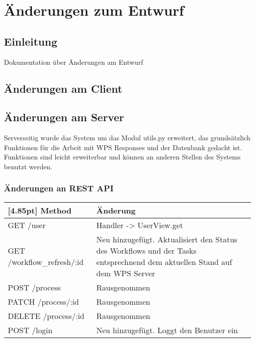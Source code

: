 \chapter{Änderungen zum Entwurf}
    
    \section{Einleitung}
        Dokumentation über Änderungen am Entwurf
    
    \section{Änderungen am Client}
    
    \section{Änderungen am Server}
        Serverseitig wurde das System um das Modul utils.py erweitert, das grundsätzlich Funktionen für die Arbeit mit WPS Responses und der Datenbank gedacht ist. Funktionen sind leicht erweiterbar und können an anderen Stellen des Systems benutzt werden. \newline
        
        
        
        \subsection{Änderungen an REST API}
        
		\begin{center}
			\setlength\tabcolsep{5pt}
			\renewcommand{\arraystretch}{1.5}

            \begin{tabularx}{\textwidth}{|l|X|}
    			\hline
    			\rowcolor[gray]{0.90}[4.85pt]
    			Method & Änderung \\ \hline
    			GET /user & Handler -> UserView.get \\ \hline
    			GET /workflow\_refresh/:id & Neu hinzugefügt. Aktualisiert den Status des Workflows und der Tasks entsprechnend dem aktuellen Stand auf dem WPS Server \\ \hline
    			POST /process & Rausgenommen \\ \hline
    			PATCH /process/:id & Rausgenommen \\ \hline
    			DELETE /process/:id & Rausgenommen \\ \hline
    			POST /login & Neu hinzugefügt. Loggt den Benutzer ein  \\ \hline
    		\end{tabularx}
		\end{center}
	
